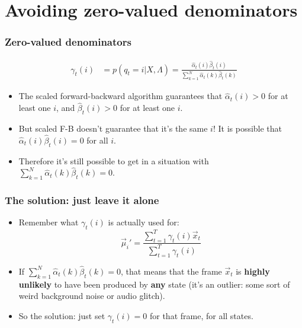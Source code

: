 \documentclass{beamer}
\begin{document}
\section[Denominators]{Avoiding zero-valued denominators}
\setcounter{subsection}{1}

\begin{frame}
  \frametitle{Zero-valued denominators}

  \begin{align*}
    \gamma_t(i) & = p(q_t=i|X,\Lambda)
    = \frac{\hat\alpha_t(i)\hat\beta_t(i)}{\sum_{k=1}^N\hat\alpha_t(k)\hat\beta_t(k)}
  \end{align*}
  \begin{itemize}
  \item The scaled forward-backward algorithm guarantees that
    $\hat\alpha_t(i)>0$ for at least one $i$, and $\hat\beta_t(i)>0$
    for at least one $i$.
  \item But scaled F-B doesn't guarantee that it's the same $i$! It is possible that
    $\hat\alpha_t(i)\hat\beta_t(i)=0$ for all $i$.
  \item Therefore it's still possible to get in a situation with
    $\sum_{k=1}^N\hat\alpha_t(k)\hat\beta_t(k)=0$.
  \end{itemize}
\end{frame}

\begin{frame}
  \frametitle{The solution: just leave it alone}

  \begin{itemize}
  \item Remember what $\gamma_t(i)$ is actually used for:
    \begin{displaymath}
      \vec\mu_{i}' = \frac{\sum_{t=1}^T\gamma_t(i)\vec{x}_{t}}{\sum_{t=1}^T\gamma_t(i)}
    \end{displaymath}
  \item If $\sum_{k=1}^N\hat\alpha_t(k)\hat\beta_t(k)=0$, that means that the frame $\vec{x}_t$ is
    {\bf highly unlikely} to have been produced by {\bf any} state (it's an  outlier: some
    sort of weird background noise or audio glitch).
  \item So the solution: just  set $\gamma_t(i)=0$ for that frame, for all states.
  \end{itemize}
\end{frame}
\end{document}
